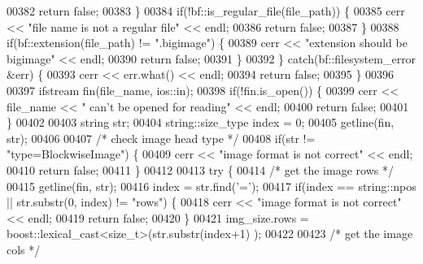 \begin{DoxyCode}
00382                         \textcolor{keywordflow}{return} \textcolor{keyword}{false};
00383                 \}
00384                 \textcolor{keywordflow}{if}(!bf::is\_regular\_file(file\_path)) \{
00385                         cerr << \textcolor{stringliteral}{"file name is not a regular file"} << endl;
00386                         \textcolor{keywordflow}{return} \textcolor{keyword}{false};
00387                 \}
00388                 \textcolor{keywordflow}{if}(bf::extension(file\_path) != \textcolor{stringliteral}{".bigimage"}) \{
00389                         cerr << \textcolor{stringliteral}{"extension should be bigimage"} << endl;
00390                         \textcolor{keywordflow}{return} \textcolor{keyword}{false};
00391                 \}
00392         \} \textcolor{keywordflow}{catch}(bf::filesystem\_error &err) \{
00393                 cerr << err.what() << endl;
00394                 \textcolor{keywordflow}{return} \textcolor{keyword}{false};
00395         \}
00396 
00397         ifstream fin(file\_name, ios::in);
00398         \textcolor{keywordflow}{if}(!fin.is\_open()) \{
00399                 cerr << file\_name << \textcolor{stringliteral}{" can't be opened for reading"} << endl;
00400                 \textcolor{keywordflow}{return} \textcolor{keyword}{false};
00401         \}
00402 
00403         \textcolor{keywordtype}{string} str;
00404         string::size\_type index = 0;
00405         getline(fin, str);
00406 
00407         \textcolor{comment}{/* check image head type */}
00408         \textcolor{keywordflow}{if}(str != \textcolor{stringliteral}{"type=BlockwiseImage"}) \{
00409                 cerr << \textcolor{stringliteral}{"image format is not correct"} << endl;
00410                 \textcolor{keywordflow}{return} \textcolor{keyword}{false};
00411         \}
00412 
00413         \textcolor{keywordflow}{try} \{
00414                 \textcolor{comment}{/* get the image rows */}
00415                 getline(fin, str);
00416                 index = str.find(\textcolor{charliteral}{'='});
00417                 \textcolor{keywordflow}{if}(index == string::npos || str.substr(0, index) != \textcolor{stringliteral}{"rows"}) \{
00418                         cerr << \textcolor{stringliteral}{"image format is not correct"} << endl;
00419                         \textcolor{keywordflow}{return} \textcolor{keyword}{false};
00420                 \}
00421                 img\_size.rows = boost::lexical\_cast<\textcolor{keywordtype}{size\_t}>(str.substr(index+1)
      );
00422 
00423                 \textcolor{comment}{/* get the image cols */}

\end{DoxyCode}
